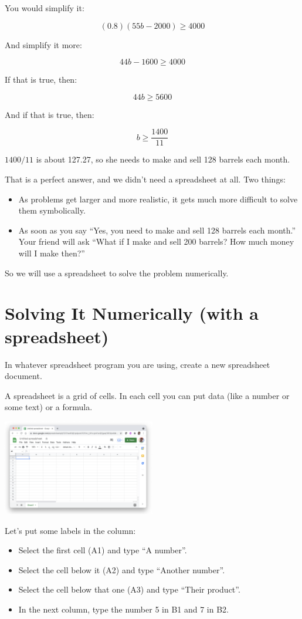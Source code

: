 You would simplify it:

$$(0.8)\left(55 b - 2000\right) \geq 4000$$

And simplify it more:

$$44b - 1600 \geq 4000$$

If that is true, then:

$$44b \geq 5600$$

And if that is true, then:

$$b \geq \frac{1400}{11}$$

$1400/11$ is about 127.27, so she needs to make and sell 128 barrels
each month.

That is a perfect answer, and we didn't need a spreadsheet at all. Two things:
\begin{itemize}
\item As problems get larger and more realistic, it gets much more difficult to solve them symbolically.
\item As soon as you say ``Yes, you need to make and sell 128 barrels
  each month.'' Your friend will ask ``What if I make and sell 200
  barrels? How much money will I make then?''
\end{itemize}

So we will use a spreadsheet to solve the problem numerically.

\section{Solving It Numerically (with a spreadsheet)}

In whatever spreadsheet program you are using, create a new spreadsheet document.

A spreadsheet is a grid of cells.  In each cell you can put data (like a number or some text) or a formula.

\includegraphics[width=0.5\textwidth]{BlankSheet.png}

Let's put some labels in the column:
\begin{itemize}
\item Select the first cell (A1) and type ``A number''.
\item Select the cell below it (A2) and type ``Another number''.
\item Select the cell below that one (A3) and type ``Their product''.
\item In the next column, type the number 5 in B1 and 7 in B2.
\end{itemize}

